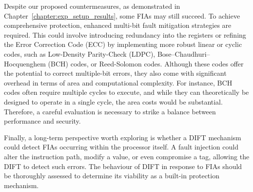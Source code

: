 Despite our proposed countermeasures, as demonstrated in Chapter~\ref{chapter:exp_setup_results}, some FIAs may still succeed. To achieve comprehensive protection, enhanced multi-bit fault mitigation strategies are required. This could involve introducing redundancy into the registers or refining the Error Correction Code (ECC) by implementing more robust linear or cyclic codes, such as Low-Density Parity-Check (LDPC), Bose–Chaudhuri–Hocquenghem (BCH) codes, or Reed-Solomon codes. Although these codes offer the potential to correct multiple-bit errors, they also come with significant overhead in terms of area and computational complexity. For instance, BCH codes often require multiple cycles to execute, and while they can theoretically be designed to operate in a single cycle, the area costs would be substantial. Therefore, a careful evaluation is necessary to strike a balance between performance and security.

Finally, a long-term perspective worth exploring is whether a DIFT mechanism could detect FIAs occurring within the processor itself. A fault injection could alter the instruction path, modify a value, or even compromise a tag, allowing the DIFT to detect such errors. The behaviour of DIFT in response to FIAs should be thoroughly assessed to determine its viability as a built-in protection mechanism.

